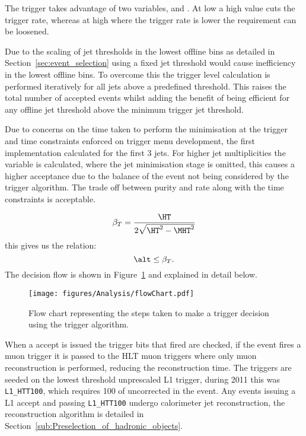 The trigger takes advantage of two variables, \HT and \alt. At low 
\HT a high \alt value cuts the trigger rate, whereas at high \HT where the
trigger rate is lower the \alt requirement can be loosened.

Due to the scaling of jet thresholds in the lowest offline \HT bins as detailed 
in Section~\ref{sec:event_selection} using a fixed jet threshold would cause 
inefficiency in the lowest offline \HT bins. To overcome this the trigger 
level \alt calculation is performed iteratively for all jets above a predefined 
threshold. This raises the total number of accepted events whilst adding the 
benefit of being efficient for any offline jet threshold above the minimum 
trigger jet threshold.

Due to concerns on the time taken to perform the \dHT minimisation at the 
trigger and time constraints enforced on trigger menu development, the first 
implementation calculated \alt for the first 3 jets. For higher jet 
multiplicities the variable \bt is calculated, where the jet minimisation stage is omitted, this causes a higher acceptance due to the balance of the event not being considered by the trigger algorithm. The trade off between purity and rate along with the time constraints is acceptable. 

\begin{equation}
  \beta_{T} = \frac{\HT}{2\sqrt{\HT^{2} - \MHT^{2}}}
  \label{eqn:betaT}
\end{equation}
this gives us the relation:
\begin{equation}
  \alt \leq \beta_{T}.
\end{equation}
The decision flow is shown in Figure~\ref{fig:figures_Analysis_flowChart} and 
explained in detail below.

\begin{figure}[ht|]
  \centering
    \texttt{[image: figures/Analysis/flowChart.pdf]}
  \caption{Flow chart representing the steps taken to make a trigger decision 
  using the \alt trigger algorithm.}
  \label{fig:figures_Analysis_flowChart}
\end{figure}


When a \Lone accept is issued the trigger bits that fired are checked, if the event fires a \Lone muon trigger it is passed to the HLT muon triggers where only muon reconstruction is performed, reducing the reconstruction time. The \alt triggers are seeded on the lowest threshold unprescaled L1 \HT trigger, during 2011 this was \texttt{L1\_HTT100}, which requires \unit{100}{\GeV} of uncorrected \HT in the event. Any events issuing a L1 accept and passing \texttt{L1\_HTT100} undergo calorimeter jet reconstruction, the reconstruction algorithm is detailed in Section~\ref{sub:Preselection_of_hadronic_objects}.

